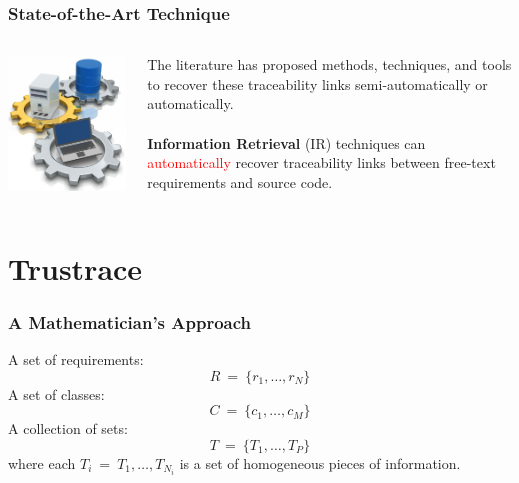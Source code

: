 \documentclass[12pt,hyperref=true,mathserif]{beamer}
\begin{document}
\begin{frame}
\frametitle{State-of-the-Art Technique}
\begin{columns}
\begin{column}{0.5\textwidth}
\includegraphics[scale=0.4]{Automation}
\end{column}
\begin{column}{0.5\textwidth}
The literature has proposed methods, techniques, and tools to recover these traceability links semi-automatically or automatically.\\
~\\
\textbf{Information Retrieval} (IR) techniques can \textcolor{red}{automatically} recover traceability links between free-text requirements and source code.
\end{column}
\end{columns}
\end{frame}

\section{Trustrace}
\begin{frame}
\frametitle{A Mathematician's Approach}
A set of requirements:
\begin{equation}
\label{equ:Requirements}
  R~=~\{r_{1},\ldots,r_{N}\}
\end{equation}
A set of classes:
\begin{equation}
\label{equ:Classes}
  C~=~\{c_{1},\ldots,c_{M}\}
\end{equation}
A collection of sets:
\begin{equation}
\label{equ:Sets}
  T~=~\{T_{1},\ldots,T_{P}\}
\end{equation}
where each $T_{i}~=~{T_{1},\ldots,T_{N_{i}}}$ is a set of homogeneous pieces of information.
\end{frame}
\end{document}
